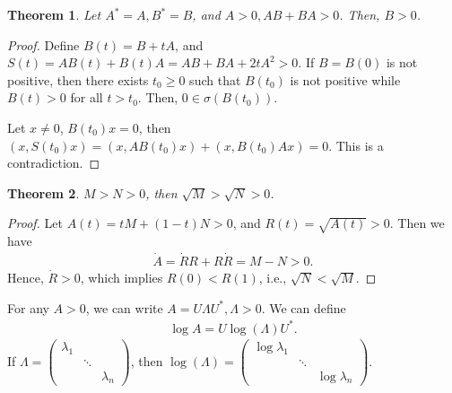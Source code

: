 \documentclass[11pt]{book}
\newtheorem{theorem}{Theorem}[chapter]
\theoremstyle{definition}
\numberwithin{equation}{chapter}
\begin{document}
\begin{theorem}
Let $A^* = A, B^* = B$, and $A > 0, AB + BA > 0$. Then, $B > 0$.
\end{theorem}
\begin{proof}
Define $B(t) = B + tA$, and $S(t) = AB(t) + B(t)A = AB + BA + 2t A^2 > 0$. If $B = B(0)$ is not positive, then there exists $t_0 \geq 0$ such that $B(t_0)$ is not positive while $B(t) > 0$ for all $t > t_0$. Then, $0 \in \sigma(B(t_0))$. 

Let $x \neq 0$, $B(t_0)x = 0$, then $(x, S(t_0)x) = (x, AB(t_0)x) + (x, B(t_0)Ax) = 0$. This is a contradiction.
\end{proof}

\medskip

\begin{theorem}
$M > N > 0$, then $\sqrt{M} > \sqrt{N} > 0$.
\end{theorem}
\begin{proof}
Let $A(t) = tM + (1-t)N > 0$, and $R(t) = \sqrt{A(t)} > 0$. Then we have 
\begin{align*}
    \dot{A} = \dot{R}R + R \dot{R} = M - N > 0.
\end{align*}
Hence, $\dot{R} > 0$, which implies $R(0) < R(1)$, i.e., $\sqrt{N} < \sqrt{M}$.
\end{proof}

\medskip

For any $A > 0$, we can write $A = U \Lambda U^*, \Lambda > 0$. We can define 
\begin{align*}
    \log A = U \log (\Lambda) U^*.
\end{align*}
If $\Lambda = \begin{pmatrix}
\lambda_1 &  &  \\
& \ddots &  \\
&  & \lambda_n
\end{pmatrix}$, then $\log (\Lambda) = \begin{pmatrix}
 \log \lambda_1 &  &  \\
& \ddots &  \\
&  & \log \lambda_n
\end{pmatrix}$.

\medskip
\end{document}
